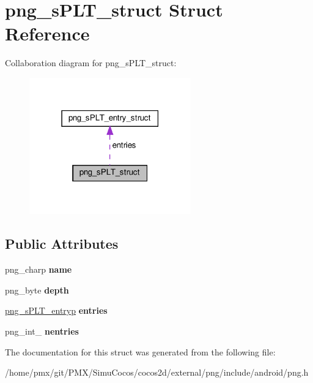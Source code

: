 \hypertarget{structpng__sPLT__struct}{}\section{png\+\_\+s\+P\+L\+T\+\_\+struct Struct Reference}
\label{structpng__sPLT__struct}


Collaboration diagram for png\+\_\+s\+P\+L\+T\+\_\+struct\+:
\nopagebreak
\begin{figure}[H]
\begin{center}
\leavevmode
\includegraphics[width=198pt]{structpng__sPLT__struct__coll__graph}
\end{center}
\end{figure}
\subsection*{Public Attributes}
\begin{DoxyCompactItemize}
\item 
\mbox{\label{structpng__sPLT__struct_af3b088b149e790b9b98ebedde69a70f0}} 
png\+\_\+charp {\bfseries name}
\item 
\mbox{\label{structpng__sPLT__struct_a6e667882cd16c9675455cebd49898b22}} 
png\+\_\+byte {\bfseries depth}
\item 
\mbox{\label{structpng__sPLT__struct_a4c7db13fb1a7f0ede434e174b20151ec}} 
\hyperlink{structpng__sPLT__entry__struct}{png\+\_\+s\+P\+L\+T\+\_\+entryp} {\bfseries entries}
\item 
\mbox{\label{structpng__sPLT__struct_ac5844e98e4c43733bad6b83b54dc7a9f}} 
png\+\_\+int\+\_ {\bfseries nentries}
\end{DoxyCompactItemize}


The documentation for this struct was generated from the following file\+:\begin{DoxyCompactItemize}
\item 
/home/pmx/git/\+P\+M\+X/\+Simu\+Cocos/cocos2d/external/png/include/android/png.\+h\end{DoxyCompactItemize}

